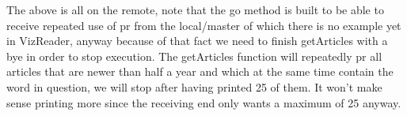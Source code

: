  
The above is all on the remote, note that the go method is built to be
able to receive repeated use of pr from the local/master of which
there is no example yet in VizReader, anyway because of that fact we
need to finish getArticles with a bye in order to stop execution. The
getArticles function will repeatedly pr all articles that are newer
than half a year and which at the same time contain the word in
question, we will stop after having printed 25 of them. It won't make
sense printing more since the receiving end only wants a maximum of 25
anyway.

